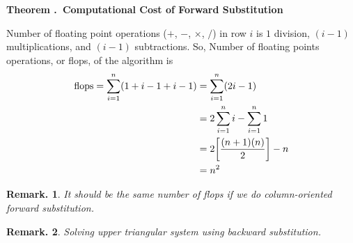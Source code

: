 \documentclass[12pt, a4paper]{article}
\newcounter{index}[subsection]
\newenvironment*{thm}[1]{\begin{tcolorbox}\par\noindent\textbf{Theorem \thesubsection.\stepcounter{index}\theindex\ #1} \par}{\par\end{tcolorbox}}
\newtheorem{rmk}{Remark.}[section]
\begin{document}
\begin{thm}{Computational Cost of Forward Substitution}
	Number of floating point operations ($+$, $-$, $\times$, $/$) in row $i$ is $1$ division, $(i-1)$ multiplications, and $(i-1)$ subtractions. So, Number of floating points operations, or flops, of the algorithm is \begin{align*}\text{flops}=\sum_{i=1}^n(1+i-1+i-1)&=\sum_{i=1}^n(2i-1)\\&=2\sum_{i=1}^ni-\sum_{i=1}^n1\\&=2\qty[\dfrac{(n+1)(n)}{2}]-n\\&=n^2\end{align*}
	\begin{rmk}It should be the same number of flops if we do column-oriented forward substitution. \end{rmk}
	\begin{rmk} Solving upper triangular system using backward substitution. \end{rmk}
\end{thm}
\end{document}

